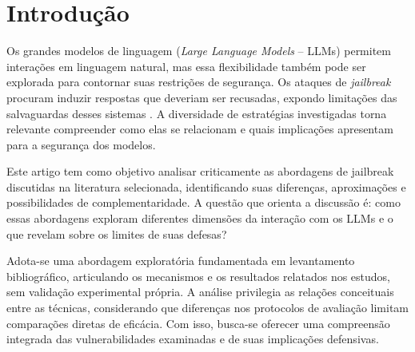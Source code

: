 \section{Introdução}
\label{cap:introducao}

Os grandes modelos de linguagem (\textit{Large Language Models} -- LLMs)
permitem interações em linguagem natural, mas essa flexibilidade também pode
ser explorada para contornar suas restrições de segurança. Os ataques de
\textit{jailbreak} procuram induzir respostas que deveriam ser recusadas,
expondo limitações das salvaguardas desses sistemas
\cite{zou2023universaltransferableadversarialattacks,zeng2024johnny,li2025prefillleveljailbreakblackboxrisk}.
A diversidade de estratégias investigadas torna relevante compreender como
elas se relacionam e quais implicações apresentam para a segurança dos modelos.

Este artigo tem como objetivo analisar criticamente as abordagens de
jailbreak discutidas na literatura selecionada, identificando suas diferenças,
aproximações e possibilidades de complementaridade. A questão que orienta
a discussão é: como essas abordagens exploram diferentes dimensões da interação
com os LLMs e o que revelam sobre os limites de suas defesas?

Adota-se uma abordagem exploratória fundamentada em levantamento bibliográfico,
articulando os mecanismos e os resultados relatados nos estudos, sem validação
experimental própria. A análise privilegia as relações conceituais entre as
técnicas, considerando que diferenças nos protocolos de avaliação limitam
comparações diretas de eficácia. Com isso, busca-se oferecer uma compreensão
integrada das vulnerabilidades examinadas e de suas implicações defensivas.
